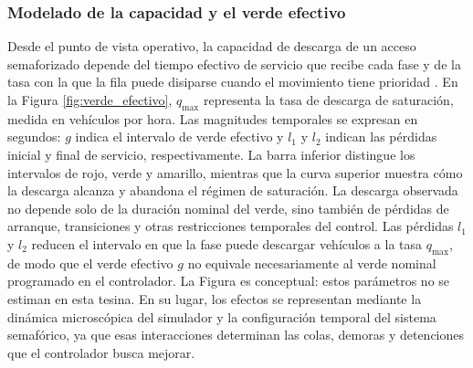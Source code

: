 \subsubsection{Modelado de la capacidad y el verde efectivo}

Desde el punto de vista operativo, la capacidad de descarga de un acceso semaforizado depende del tiempo efectivo de servicio que recibe cada fase y de la tasa con la que la fila puede disiparse cuando el movimiento tiene prioridad \cite{fernandez}. En la Figura \ref{fig:verde_efectivo}, $q_{\max}$ representa la tasa de descarga de saturación, medida en vehículos por hora. Las magnitudes temporales se expresan en segundos: $g$ indica el intervalo de verde efectivo y $l_1$ y $l_2$ indican las pérdidas inicial y final de servicio, respectivamente. La barra inferior distingue los intervalos de rojo, verde y amarillo, mientras que la curva superior muestra cómo la descarga alcanza y abandona el régimen de saturación. La descarga observada no depende solo de la duración nominal del verde, sino también de pérdidas de arranque, transiciones y otras restricciones temporales del control. Las pérdidas $l_1$ y $l_2$ reducen el intervalo en que la fase puede descargar vehículos a la tasa $q_{\max}$, de modo que el verde efectivo $g$ no equivale necesariamente al verde nominal programado en el controlador. La Figura es conceptual: estos parámetros no se estiman en esta tesina. En su lugar, los efectos se representan mediante la dinámica microscópica del simulador y la configuración temporal del sistema semafórico, ya que esas interacciones determinan las colas, demoras y detenciones que el controlador busca mejorar.

